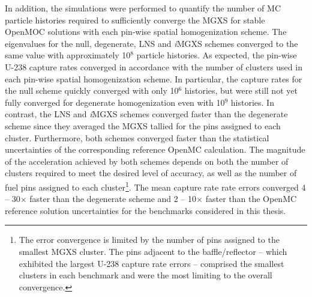 
In addition, the simulations were performed to quantify the number of \ac{MC} particle histories required to sufficiently converge the \ac{MGXS} for stable OpenMOC solutions with each pin-wise spatial homogenization scheme. The eigenvalues for the null, degenerate, \ac{LNS} and \textit{i}\ac{MGXS} schemes converged to the same value with approximately 10$^{8}$ particle histories. As expected, the pin-wise U-238 capture rates converged in accordance with the number of clusters used in each pin-wise spatial homogenization scheme. In particular, the capture rates for the null scheme quickly converged with only 10$^{6}$ histories, but were still not yet fully converged for degenerate homogenization even with 10$^{9}$ histories. In contrast, the \ac{LNS} and \textit{i}\ac{MGXS} schemes converged faster than the degenerate scheme since they averaged the \ac{MGXS} tallied for the pins assigned to each cluster. Furthermore, both schemes converged faster than the statistical uncertainties of the corresponding reference OpenMC calculation. The magnitude of the acceleration achieved by both schemes depends on both the number of clusters required to meet the desired level of accuracy, as well as the number of fuel pins assigned to each cluster\footnote{The error convergence is limited by the number of pins assigned to the smallest \ac{MGXS} cluster. The pins adjacent to the baffle/reflector -- which exhibited the largest U-238 capture rate errors -- comprised the smallest clusters in each benchmark and were the most limiting to the overall convergence.}. The mean capture rate rate errors converged 4 -- 30$\times$ faster than the degenerate scheme and 2 -- 10$\times$ faster than the OpenMC reference solution uncertainties for the benchmarks considered in this thesis.



